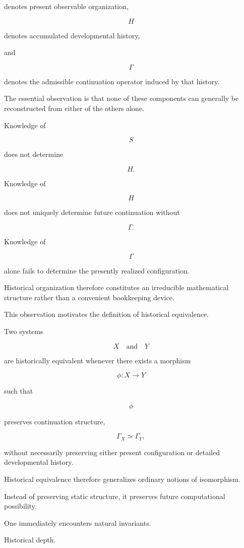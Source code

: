 \documentclass[12pt,oneside]{article}
\theoremstyle{remark}
\begin{document}
denotes present observable organization,

\[
H
\]

denotes accumulated developmental history,

and

\[
\Gamma
\]

denotes the admissible continuation operator induced by that history.

The essential observation is that none of these components can generally be
reconstructed from either of the others alone.

Knowledge of

\[
S
\]

does not determine

\[
H.
\]

Knowledge of

\[
H
\]

does not uniquely determine future continuation without

\[
\Gamma.
\]

Knowledge of

\[
\Gamma
\]

alone fails to determine the presently realized configuration.

Historical organization therefore constitutes an irreducible mathematical
structure rather than a convenient bookkeeping device.

This observation motivates the definition of historical equivalence.

Two systems

\[
X
\quad
\text{and}
\quad
Y
\]

are historically equivalent whenever there exists a morphism

\[
\phi
:
X
\rightarrow
Y
\]

such that

\[
\phi
\]

preserves continuation structure,

\[
\Gamma_X
\simeq
\Gamma_Y,
\]

without necessarily preserving either present configuration or detailed
developmental history.

Historical equivalence therefore generalizes ordinary notions of isomorphism.

Instead of preserving static structure, it preserves future computational
possibility.

One immediately encounters natural invariants.

Historical depth.
\end{document}
